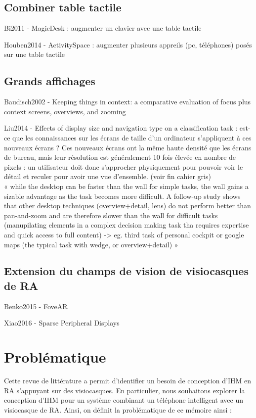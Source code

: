 \subsection{Combiner table tactile}
Bi2011 - MagicDesk : augmenter un clavier avec une table tactile

Houben2014 - ActivitySpace : augmenter plusieurs appreils (pc, téléphones) posés sur une table tactile

\subsection{Grands affichages}
Baudisch2002 - Keeping things in context: a comparative evaluation of focus plus context screens, overviews, and zooming

Liu2014 - Effects of display size and navigation type on a classification task : est-ce que les connaissances sur les écrans de taille d'un ordinateur s'appliquent à ces nouveaux écrans ? Ces nouveaux écrans ont la même haute densité que les écrans de bureau, mais leur résolution est généralement 10 fois élevée en nombre de pixels : un utilisateur doit donc s'approcher physiquement pour pouvoir voir le détail et reculer pour avoir une vue d'ensemble. (voir fin cahier gris)\\
« while the desktop can be faster than the wall for simple tasks, the wall gains a sizable advantage as the task becomes more difficult. A follow-up study shows that other desktop techniques (overview+detail, lens) do not perform better than pan-and-zoom and are therefore slower than the wall for difficult tasks (manupilating elements in a complex decision making task tha requires expertise and quick access to full content) -> eg. third task of personal cockpit or google maps (the typical task with wedge, or overview+detail) »

\subsection{Extension du champs de vision de visiocasques de RA}
Benko2015 - FoveAR

Xiao2016 - Sparse Peripheral Displays


\section{Problématique}
Cette revue de littérature a permit d'identifier un besoin de conception d'IHM en RA s'appuyant sur des visiocasques. En particulier, nous souhaitons explorer la conception d'IHM pour un système combinant un téléphone intelligent avec un visiocasque de RA. Ainsi, on définit la problématique de ce mémoire ainsi :

